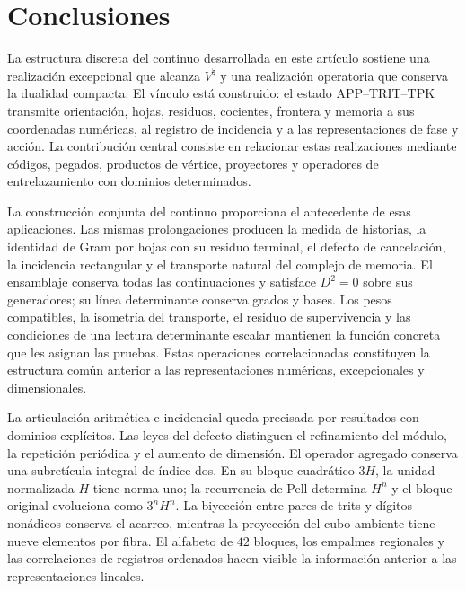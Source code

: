 \section{Conclusiones}
\label{iv:conclusiones}
\begingroup
\setlength{\parskip}{0pt}
\setlength{\abovedisplayskip}{5pt}
\setlength{\belowdisplayskip}{5pt}

La estructura discreta del continuo desarrollada en este artículo
sostiene una realización excepcional que alcanza \(V^\natural\) y
una realización operatoria que conserva la dualidad compacta.
El vínculo está construido: el estado APP--TRIT--TPK transmite
orientación, hojas, residuos, cocientes, frontera y memoria a sus
coordenadas numéricas, al registro de incidencia y a las representaciones
de fase y acción. La contribución central consiste en relacionar estas
realizaciones mediante códigos, pegados, productos de vértice,
proyectores y operadores de entrelazamiento con dominios determinados.

La construcción conjunta del continuo proporciona el antecedente de
esas aplicaciones. Las mismas prolongaciones producen la medida de
historias, la identidad de Gram por hojas con su residuo terminal,
el defecto de cancelación, la incidencia rectangular y el transporte
natural del complejo de memoria. El ensamblaje conserva todas las
continuaciones y satisface \(D^2=0\) sobre sus generadores; su línea
determinante conserva grados y bases. Los pesos compatibles, la
isometría del transporte, el residuo de supervivencia y las condiciones
de una lectura determinante escalar mantienen la función concreta que
les asignan las pruebas. Estas operaciones correlacionadas constituyen
la estructura común anterior a las representaciones numéricas,
excepcionales y dimensionales.

La articulación aritmética e incidencial queda precisada por resultados
con dominios explícitos. Las leyes del defecto distinguen el refinamiento
del módulo, la repetición periódica y el aumento de dimensión. El operador
agregado conserva una subretícula integral de índice dos. En su bloque
cuadrático \(3H\), la unidad normalizada \(H\) tiene norma uno; la
recurrencia de Pell determina \(H^n\) y el bloque original evoluciona
como \(3^nH^n\).
La biyección entre pares de trits y dígitos nonádicos conserva el acarreo,
mientras la proyección del cubo ambiente tiene nueve elementos por fibra.
El alfabeto de \(42\) bloques, los empalmes regionales y las correlaciones
de registros ordenados hacen visible la información anterior a las
representaciones lineales.

